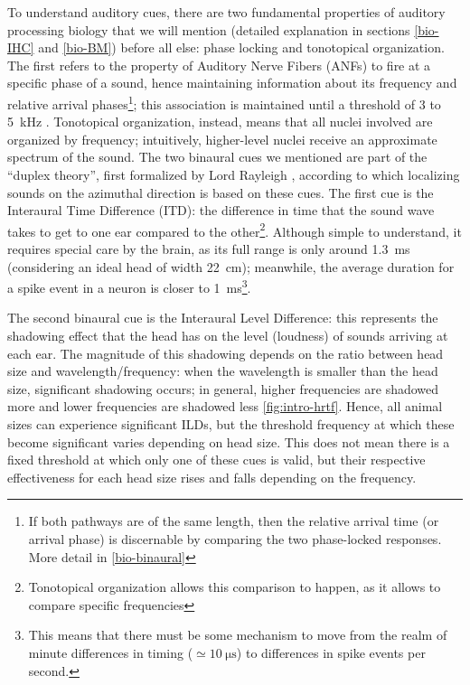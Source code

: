 \documentclass[11pt,a4paper]{article}
\newcommand{\parspace}{\vspace{7pt}}
\begin{document}
\parspace
To understand auditory cues, there are two fundamental properties of auditory processing biology that we will mention (detailed explanation in sections \ref{bio-IHC} and \ref{bio-BM}) before all else: phase locking and tonotopical organization. The first refers to the property of Auditory Nerve Fibers (ANFs) to fire at a specific phase of a sound, hence maintaining information about its frequency and relative arrival phases\footnote{If both pathways are of the same length, then the relative arrival time (or arrival phase) is discernable by comparing the two phase-locked responses. More detail in \ref{bio-binaural}}; this association is maintained until a threshold of 3 to \qty{5}{\kilo\hertz} \cite{yinNeuralMechanismsBinaural2019}. Tonotopical organization, instead, means that all nuclei involved are organized by frequency; intuitively, higher-level nuclei receive an approximate spectrum of the sound.
The two binaural cues we mentioned are part of the ``duplex theory'', first formalized by Lord Rayleigh \cite{rayleighXIIOurPerception1907}, according to which localizing sounds on the azimuthal direction is based on these cues. The first cue is the Interaural Time Difference (ITD): the difference in time that the sound wave takes to get to one ear compared to the other\footnote{Tonotopical organization allows this comparison to happen, as it allows to compare specific frequencies}. Although simple to understand, it requires special care by the brain, as its full range is only around \qty{1.3}{\milli\second} (considering an ideal head of width \qty{22}{\centi\meter}); meanwhile, the average duration for a spike event in a neuron is closer to \qty{1}{\milli\second}\footnote{This means that there must be some mechanism to move from the realm of minute differences in timing ($\simeq\qty{10}{\micro\second}$) to differences in spike events per second.}. 

The second binaural cue is the Interaural Level Difference: this represents the shadowing effect that the head has on the level (loudness) of sounds arriving at each ear. The magnitude of this shadowing depends on the ratio between head size and wavelength/frequency: when the wavelength is smaller than the head size, significant shadowing occurs; in general, higher frequencies are shadowed more and lower frequencies are shadowed less \ref{fig:intro-hrtf}. Hence, all animal sizes can experience significant ILDs, but the threshold frequency at which these become significant varies depending on head size. This does not mean there is a fixed threshold at which only one of these cues is valid, but their respective effectiveness for each head size rises and falls depending on the frequency.
\end{document}

